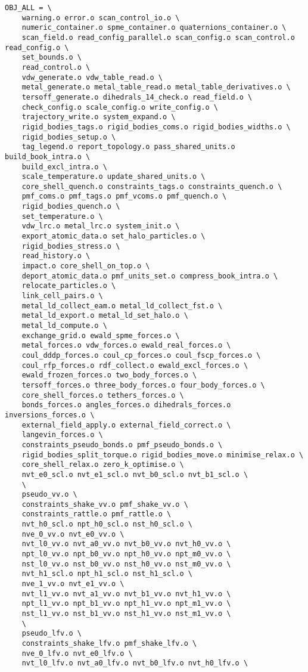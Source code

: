 \begin{verbatim}
OBJ_ALL = \
	warning.o error.o scan_control_io.o \
	numeric_container.o spme_container.o quaternions_container.o \
	scan_field.o read_config_parallel.o scan_config.o scan_control.o read_config.o \
	set_bounds.o \
	read_control.o \
	vdw_generate.o vdw_table_read.o \
	metal_generate.o metal_table_read.o metal_table_derivatives.o \
	tersoff_generate.o dihedrals_14_check.o read_field.o \
	check_config.o scale_config.o write_config.o \
	trajectory_write.o system_expand.o \
	rigid_bodies_tags.o rigid_bodies_coms.o rigid_bodies_widths.o \
	rigid_bodies_setup.o \
	tag_legend.o report_topology.o pass_shared_units.o build_book_intra.o \
	build_excl_intra.o \
	scale_temperature.o update_shared_units.o \
	core_shell_quench.o constraints_tags.o constraints_quench.o \
	pmf_coms.o pmf_tags.o pmf_vcoms.o pmf_quench.o \
	rigid_bodies_quench.o \
	set_temperature.o \
	vdw_lrc.o metal_lrc.o system_init.o \
	export_atomic_data.o set_halo_particles.o \
	rigid_bodies_stress.o \
	read_history.o \
	impact.o core_shell_on_top.o \
	deport_atomic_data.o pmf_units_set.o compress_book_intra.o \
	relocate_particles.o \
	link_cell_pairs.o \
	metal_ld_collect_eam.o metal_ld_collect_fst.o \
	metal_ld_export.o metal_ld_set_halo.o \
	metal_ld_compute.o \
	exchange_grid.o ewald_spme_forces.o \
	metal_forces.o vdw_forces.o ewald_real_forces.o \
	coul_dddp_forces.o coul_cp_forces.o coul_fscp_forces.o \
	coul_rfp_forces.o rdf_collect.o ewald_excl_forces.o \
	ewald_frozen_forces.o two_body_forces.o \
	tersoff_forces.o three_body_forces.o four_body_forces.o \
	core_shell_forces.o tethers_forces.o \
	bonds_forces.o angles_forces.o dihedrals_forces.o inversions_forces.o \
	external_field_apply.o external_field_correct.o \
	langevin_forces.o \
	constraints_pseudo_bonds.o pmf_pseudo_bonds.o \
	rigid_bodies_split_torque.o rigid_bodies_move.o minimise_relax.o \
	core_shell_relax.o zero_k_optimise.o \
	nvt_e0_scl.o nvt_e1_scl.o nvt_b0_scl.o nvt_b1_scl.o \
	\
	pseudo_vv.o \
	constraints_shake_vv.o pmf_shake_vv.o \
	constraints_rattle.o pmf_rattle.o \
	nvt_h0_scl.o npt_h0_scl.o nst_h0_scl.o \
	nve_0_vv.o nvt_e0_vv.o \
	nvt_l0_vv.o nvt_a0_vv.o nvt_b0_vv.o nvt_h0_vv.o \
	npt_l0_vv.o npt_b0_vv.o npt_h0_vv.o npt_m0_vv.o \
	nst_l0_vv.o nst_b0_vv.o nst_h0_vv.o nst_m0_vv.o \
	nvt_h1_scl.o npt_h1_scl.o nst_h1_scl.o \
	nve_1_vv.o nvt_e1_vv.o \
	nvt_l1_vv.o nvt_a1_vv.o nvt_b1_vv.o nvt_h1_vv.o \
	npt_l1_vv.o npt_b1_vv.o npt_h1_vv.o npt_m1_vv.o \
	nst_l1_vv.o nst_b1_vv.o nst_h1_vv.o nst_m1_vv.o \
	\
	pseudo_lfv.o \
	constraints_shake_lfv.o pmf_shake_lfv.o \
	nve_0_lfv.o nvt_e0_lfv.o \
	nvt_l0_lfv.o nvt_a0_lfv.o nvt_b0_lfv.o nvt_h0_lfv.o \

\end{verbatim}
